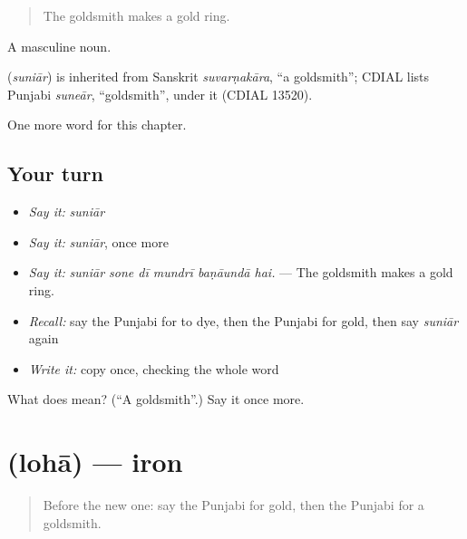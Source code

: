 \begin{quote}
The goldsmith makes a gold ring.
\end{quote}

A masculine noun.

\begin{cousinweb}
\textbf{} (\emph{suniār}) is inherited from Sanskrit \emph{suvarṇakāra}, \textquotedblleft{}a goldsmith\textquotedblright{}; CDIAL lists Punjabi \emph{suneār}, \textquotedblleft{}goldsmith\textquotedblright{}, under it (CDIAL 13520).
\end{cousinweb}

\begin{grammarlens}[title={What you've built}]
One more word for this chapter.
\end{grammarlens}

\subsection*{Your turn}
\begin{itemize}
\raggedright
  \item \emph{Say it:} \emph{suniār}
  \item \emph{Say it:} \emph{suniār}, once more
  \item \emph{Say it:} \emph{suniār sone dī mundrī baṇāundā hai.} — The goldsmith makes a gold ring.
  \item \emph{Recall:} say the Punjabi for to dye, then the Punjabi for gold, then say \emph{suniār} again
  \item \emph{Write it:} copy \textbf{} once, checking the whole word
\end{itemize}

\begin{tcolorbox}[breakable,colback=teal!4,colframe=teal!35!black,title={Before you move on}]
What does  mean? (\textquotedblleft{}A goldsmith\textquotedblright{}.) Say it once more.
\end{tcolorbox}
\section[\texorpdfstring{\pa{ਲੋਹਾ} (lohā)}{ਲੋਹਾ (lohā)}]{ (lohā) — iron}

\label{lesson:PA-C335-loha}



\begin{quote}
Before the new one: say the Punjabi for gold, then the Punjabi for a goldsmith.
\end{quote}

